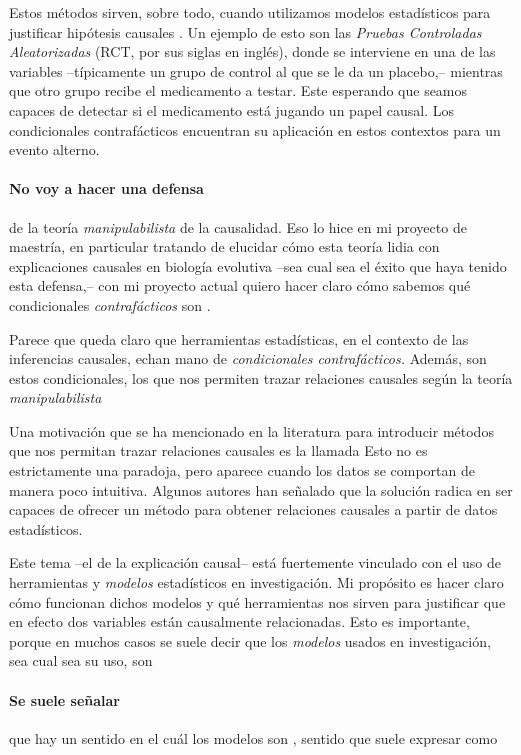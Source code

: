 Estos métodos sirven, sobre todo, cuando utilizamos modelos estadísticos para justificar hipótesis causales \parencite{Pearl2016, Pearl2018}.
Un ejemplo de esto son las \emph{Pruebas Controladas Aleatorizadas} (RCT, por sus siglas en inglés), donde se interviene en una de las variables --típicamente un grupo
de control al que se le da un placebo,-- mientras que otro grupo recibe el medicamento a testar.
Este esperando que seamos capaces de detectar si el
medicamento está jugando un papel causal. 
Los condicionales contrafácticos encuentran su aplicación en estos contextos para  un evento alterno.

\paragraph{No voy a hacer una defensa} de la teoría \emph{manipulabilista} de la causalidad. 
Eso lo hice en mi proyecto de maestría, en particular tratando de elucidar cómo esta teoría lidia con explicaciones causales en biología evolutiva --sea cual sea el éxito que haya tenido esta defensa,-- con
mi proyecto actual quiero hacer claro cómo sabemos qué condicionales \emph{contrafácticos} son .

Parece que queda claro que herramientas estadísticas, en el contexto de las inferencias causales, echan mano de \emph{condicionales contrafácticos.}
Además, son estos condicionales, los que nos permiten trazar relaciones causales según la teoría \emph{manipulabilista}

Una motivación que se ha mencionado en la literatura para introducir métodos que nos permitan trazar relaciones causales es la llamada 
Esto no es estrictamente una paradoja, pero aparece cuando los datos se comportan de manera poco intuitiva. \parencite[p.~13]{Hajek2016-HAJOHO}
Algunos autores han señalado que la solución radica en ser capaces de ofrecer un método para obtener relaciones causales a partir de datos estadísticos.

Este tema --el de la explicación causal-- está fuertemente vinculado con el uso de herramientas y \emph{modelos} estadísticos en investigación.
Mi propósito es hacer claro cómo funcionan dichos modelos y qué herramientas nos sirven para justificar que en efecto dos variables están causalmente relacionadas.
Esto es importante, porque en muchos casos se suele decir que los \emph{modelos} usados en investigación, sea cual sea su uso, son  


\paragraph{Se suele señalar} que hay un sentido en el cuál los modelos son , sentido que suele expresar como  \parencite[p.~18, énfasis agregado]{Potochnik2017-POTIAT-3}

